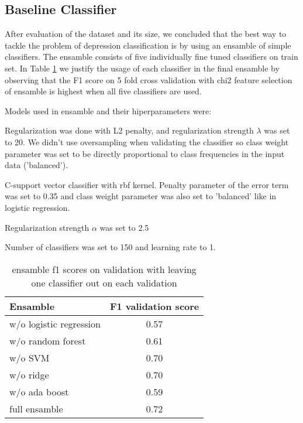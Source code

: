 \documentclass[10pt, a4paper]{article}
\begin{document}
\subsection{Baseline Classifier}

After evaluation of the dataset and its size, we concluded that the best way to tackle the problem of
 depression classification is by using an ensamble of simple classifiers. The ensamble consists of five
 individually fine tuned classifiers on train set. In Table \ref{table:ensamble-validation} we justify the
 usage of each classifier in the final ensamble by observing that the F1 score on 5 fold cross validation
 with chi2 feature selection of ensamble is highest when all five classifiers are used.

Models used in ensamble and their hiperparameters were:
\begin{description}[style=unboxed, leftmargin=0cm]
 \item[$\bullet$ Logistic regression:] Regularization was done with L2 penalty, and regularization strength
 $\lambda$ was set to 20. We didn't use oversampling when validating the classifier so class weight parameter was
 set to be directly proportional to class frequencies in the input data ('balanced').
 \item[$\bullet$ Random forest]
 \item[$\bullet$ SVM:] C-support vector classifier with rbf kernel. Penalty parameter of the error term was
  set to 0.35 and class weight parameter was also set to 'balanced' like in logistic regression.
 \item[$\bullet$ Ridge classifier:] Regularization strength $\alpha$ was set to 2.5
 \item[$\bullet$ Ada boost:] Number of classifiers was set to 150 and learning rate to 1.
\end{description}

\begin{table}[htp]
\caption{ensamble f1 scores on validation with leaving one classifier out on each validation\label{table:ensamble-validation}}
\begin{center}
\begin{tabular}{lc}
\toprule
Ensamble & F1 validation score\\
\midrule
w/o logistic regression & 0.57\\
w/o random forest & 0.61\\
w/o SVM & 0.70\\
w/o ridge & 0.70\\
w/o ada boost & 0.59\\
full ensamble & 0.72\\
\bottomrule
\end{tabular}
\end{center}
\end{table}
\end{document}
